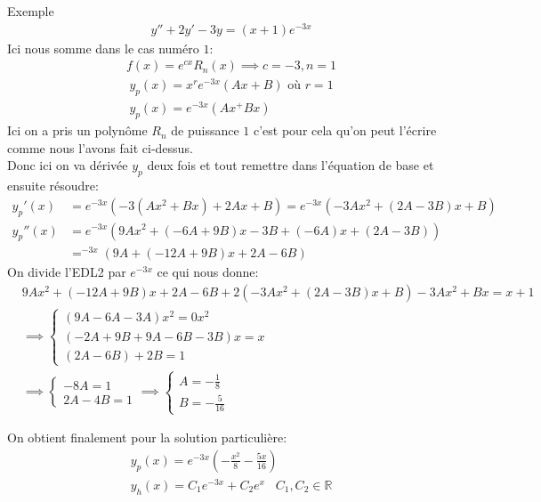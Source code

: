     \begin{parag}{Exemple}
        \begin{align*}
            y'' + 2y' - 3y = (x + 1)e^{-3x}
        \end{align*}
        Ici nous somme dans le cas numéro $1$:
        \begin{align*}
            f(x) = e^{cx}R_n(x) \implies c = -3, n = 1
        \end{align*}
       \begin{align*}
        y_p(x) = x^re^{-3x}(Ax + B) \text{ où } r = 1 \\
        y_p(x) = e^{-3x}(Ax^+ Bx)
       \end{align*}
       Ici on a pris un polynôme $R_n$ de puissance $1$ c'est pour cela qu'on peut l'écrire comme nous l'avons fait ci-dessus.
       \\
       Donc ici on va dérivée $y_p$ deux fois et tout remettre dans l'équation de base et ensuite résoudre:
       \begin{align*}
           y_p'(x) &= e^{-3x}(-3(Ax^2 + Bx) + 2Ax + B) = e^{-3x}(-3Ax^2 + (2A -3B)x + B) \\
           y_p''(x) &= e^{-3x}(9Ax^2 +  (-6A + 9B)x - 3B + (-6A)x + (2A - 3B)) \\
                    &= ^{-3x}(9A + (-12A + 9B)x + 2A - 6B)
       \end{align*}
       On divide l'EDL2 par $e^{-3x}$ ce qui nous donne:
       \begin{align*}
           &9Ax^2 + (-12A + 9B)x + 2A - 6B + 2(-3Ax^2 + (2A - 3B)x + B) -3Ax^2 + Bx = x+1 \\
           &\implies \begin{cases}
               (9A - 6A -3A)x^2 = 0x^2 \\
               (-2A + 9B + 9A - 6B - 3B)x = x \\
               (2A - 6B) + 2B = 1
           \end{cases} \\
           &\implies \begin{cases}
               -8A = 1 \\
               2A - 4B = 1
           \end{cases} \implies \begin{cases}
               A = - \frac{1}{8}\\
               B = - \frac{5}{16}
           \end{cases}
       \end{align*}
       
       On obtient finalement pour la solution particulière:
       \begin{align*}
           y_p(x) = e^{-3x} \left( - \frac{x^2}{8} - \frac{5x}{16} \right) \\
          y_h(x) = C_1 e^{-3x} + C_2e^x \; \; \; C_1, C_2 \in \mathbb{R}
       \end{align*}
       
       

        
        
        
 

\end{parag}

